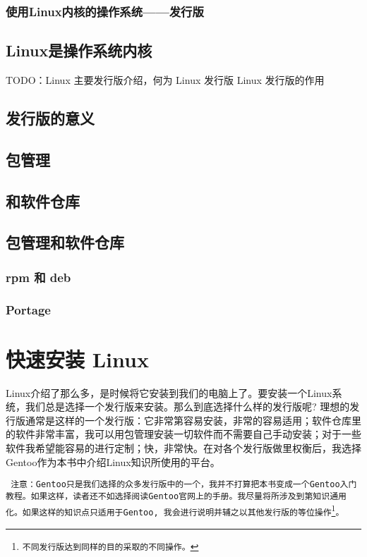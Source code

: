 \documentclass[amstex]{ctexbook}
\newenvironment{notice}{\tt}{}
\begin{document}
\subsection{使用Linux内核的操作系统——发行版}
\section{Linux是操作系统内核}

TODO：Linux 主要发行版介绍，何为 Linux 发行版 Linux 发行版的作用

\section{发行版的意义}
\section{包管理}
\section{和软件仓库}


\section{包管理和软件仓库}

\subsection*{rpm 和 deb}
\subsection*{Portage}


\chapter{快速安装 Linux}
Linux介绍了那么多，是时候将它安装到我们的电脑上了。要安装一个Linux系统，我们总是选择一个发行版来安装。那么到底选择什么样的发行版呢? 理想的发行版通常是这样的一个发行版：它非常第容易安装，非常的容易适用；软件仓库里的软件非常丰富，我可以用包管理安装一切软件而不需要自己手动安装；对于一些软件我希望能容易的进行定制；快，非常快。在对各个发行版做里权衡后，我选择Gentoo作为本书中介绍Linux知识所使用的平台。


\begin{notice}
 注意：Gentoo只是我们选择的众多发行版中的一个，我并不打算把本书变成一个Gentoo入门教程。如果这样，读者还不如选择阅读Gentoo官网上的手册。我尽量将所涉及到第知识通用化。如果这样的知识点只适用于Gentoo, 我会进行说明并辅之以其他发行版的等位操作\footnote{不同发行版达到同样的目的采取的不同操作。}。
\end{notice}
\end{document}
